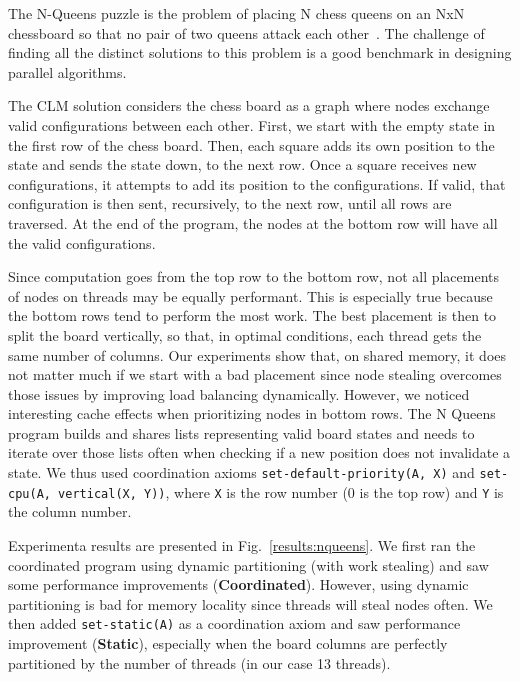 The N-Queens puzzle is the problem of placing N chess queens on an NxN
chessboard so that no pair of two queens attack each
other~\cite{8queens}. The challenge of finding all the
distinct solutions to this problem is a good benchmark in designing
parallel algorithms.

The CLM solution considers the chess board as a graph where nodes exchange valid
configurations between each other. First, we start with the empty
state in the first row of the chess board. Then, each square adds its own
position to the state and sends the state down, to the next row. Once a square
receives new configurations, it attempts to add its position to the
configurations. If valid, that configuration is then sent, recursively, to the
next row, until all rows are traversed. At the end of the program, the nodes at
the bottom row will have all the valid configurations.

Since computation goes from the top row to the bottom row, not all placements of
nodes on threads may be equally performant. This is especially true because the
bottom rows tend to perform the most work. The best placement is then to split the
board vertically, so that, in optimal conditions, each thread gets the same
number of columns. Our experiments show that, on shared memory, it does not
matter much if we start with a bad placement since node stealing overcomes those
issues by improving load balancing dynamically. However, we noticed interesting
cache effects when prioritizing nodes in bottom rows. The N Queens program
builds and shares lists representing valid board states and needs to iterate
over those lists often when checking if a new position does not invalidate a state.
We thus used coordination axioms \texttt{set-default-priority(A, X)} and \texttt{set-cpu(A,
vertical(X, Y))}, where \texttt{X} is the row number (0 is the top row) and
\texttt{Y} is the column number.

Experimenta results are presented in Fig.~\ref{results:nqueens}.
We first ran the coordinated program using dynamic partitioning (with work
stealing) and saw some performance improvements (\textbf{Coordinated}). However, using dynamic
partitioning is bad for memory locality since threads will steal nodes often.
We then added \texttt{set-static(A)} as a coordination axiom and saw
performance improvement (\textbf{Static}), especially when the board columns are perfectly
partitioned by the number of threads (in our case 13 threads).


